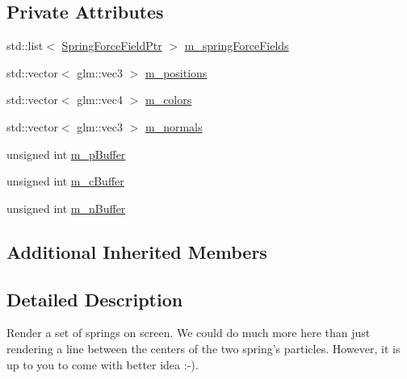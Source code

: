 \subsection*{Private Attributes}
\begin{DoxyCompactItemize}
\item 
std\+::list$<$ \hyperlink{SpringForceField_8hpp_a3f4fbe1af2c46f8804b45f804dacc708}{Spring\+Force\+Field\+Ptr} $>$ \hyperlink{classSpringListRenderable_a82f97da2e2faf5652fcac1e3cd31a60e}{m\+\_\+spring\+Force\+Fields}
\item 
std\+::vector$<$ glm\+::vec3 $>$ \hyperlink{classSpringListRenderable_ad6c28805d7de299edb36f01e0b06208c}{m\+\_\+positions}
\item 
std\+::vector$<$ glm\+::vec4 $>$ \hyperlink{classSpringListRenderable_ad040942c462bc6f263ed2fa179fc7567}{m\+\_\+colors}
\item 
std\+::vector$<$ glm\+::vec3 $>$ \hyperlink{classSpringListRenderable_a63491699391194b90b3d2b4863cccf2e}{m\+\_\+normals}
\item 
unsigned int \hyperlink{classSpringListRenderable_af7d75796cec2e6642f04cbe419d2b65b}{m\+\_\+p\+Buffer}
\item 
unsigned int \hyperlink{classSpringListRenderable_a5f7e5d08fc94377d2dec95d0cc78cfe9}{m\+\_\+c\+Buffer}
\item 
unsigned int \hyperlink{classSpringListRenderable_a4159b0ea8821a34e3be6a0a338d95a3b}{m\+\_\+n\+Buffer}
\end{DoxyCompactItemize}
\subsection*{Additional Inherited Members}


\subsection{Detailed Description}
Render a set of springs on screen. We could do much more here than just rendering a line between the centers of the two spring's particles. However, it is up to you to come with better idea \+:-\/). 

